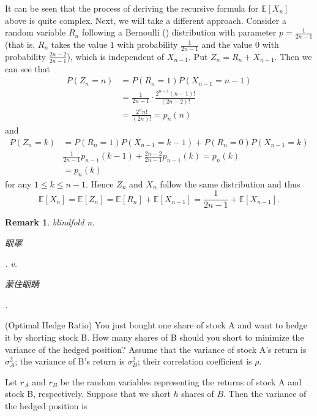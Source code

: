 \documentclass[12pt,letterpaper, onecolumn]{exam}
\newtheorem{remark}{Remark}
\begin{document}
\begin{questions}
\begin{solution}
            \quad It can be seen that the process of deriving the recursive formula for $\mathbb{E}[X_n]$ above is quite complex. Next, we will take a different approach. Consider a random variable $R_n$ following a Bernoulli () distribution with parameter $p=\frac{1}{2n-1}$ (that is, $R_n$ takes the value $1$ with probability $\frac{1}{2n-1}$ and the value $0$ with probability $\frac{2n-2}{2n-1}$), which is independent of $X_{n-1}$. Put $Z_n=R_n+X_{n-1}$. Then we can see that
            \begin{align*}
                P(Z_n=n)&=P(R_n=1)P(X_{n-1}=n-1)\\
                &=\frac{1}{2n-1}\cdot\frac{2^{n-1}(n-1)!}{(2n-2)!}\\
                &=\frac{2^nn!}{(2n)!}=p_n(n)
            \end{align*}
            and
            \begin{align*}
                P(Z_n=k)&=P(R_n=1)P(X_{n-1}=k-1)+P(R_n=0)P(X_{n-1}=k)\\
                &\frac{1}{2n-1}p_{n-1}(k-1)+\frac{2n-2}{2n-1}p_{n-1}(k)=p_n(k)\\
                &=p_n(k)
            \end{align*}
            for any $1\le k\le n-1$. Hence $Z_n$ and $X_n$ follow the same distribution and thus
            $$\mathbb{E}[X_n]=\mathbb{E}[Z_n]=\mathbb{E}[R_n]+\mathbb{E}[X_{n-1}]=\frac{1}{2n-1}+\mathbb{E}[X_{n-1}].$$
        \end{solution}
        \begin{remark}
            blindfold  n. \begin{CJK}{UTF8}{gbsn}眼罩\end{CJK}. v. \begin{CJK}{UTF8}{gbsn}蒙住眼睛\end{CJK}.
        \end{remark}
        \question[](Optimal Hedge Ratio) You just bought one share of stock A and want to hedge it by shorting stock B. How many shares of B should you short to minimize the variance of the hedged position? Assume that the variance of stock A’s return is $\sigma_A^2$; the variance of B’s return is $\sigma_B^2$; their correlation coefficient is $\rho$.
        \begin{solution}
            Let $r_A$ and $r_B$ be the random variables representing the returns of stock A and stock B, respectively. Suppose that we short $h$ shares of $B$. Then the variance of the hedged position is

\end{solution}
\end{questions}
\end{document}
